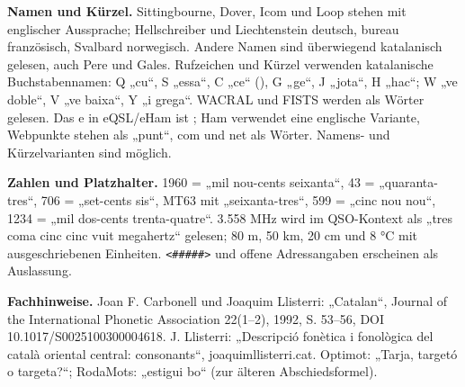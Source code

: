 \documentclass[a4paper,landscape,10pt]{article}
\newcommand{\ipa}[1]{{\ipafont[#1]}}
\begin{document}
\smallskip
\textbf{Namen und Kürzel.} Sittingbourne, Dover, Icom und Loop stehen mit englischer Aussprache;
Hellschreiber und Liechtenstein deutsch, bureau französisch, Svalbard norwegisch.
Andere Namen sind überwiegend katalanisch gelesen, auch Pere und Gales.
Rufzeichen und Kürzel verwenden katalanische Buchstabennamen: Q „cu“, S „essa“, C „ce“ (\ipa{se}),
G „ge“, J „jota“, H „hac“; W „ve doble“, V „ve baixa“, Y „i grega“.
WACRAL und FISTS werden als Wörter gelesen. Das e in eQSL/eHam ist \ipa{i}; Ham verwendet eine englische Variante,
Webpunkte stehen als „punt“, com und net als Wörter. Namens- und Kürzelvarianten sind möglich.

\smallskip
\textbf{Zahlen und Platzhalter.} 1960 = „mil nou-cents seixanta“, 43 = „quaranta-tres“,
706 = „set-cents sis“, MT63 mit „seixanta-tres“, 599 = „cinc nou nou“,
1234 = „mil dos-cents trenta-quatre“. 3.558 MHz wird im QSO-Kontext als „tres coma cinc cinc vuit megahertz“
gelesen; 80 m, 50 km, 20 cm und 8 °C mit ausgeschriebenen Einheiten.
\texttt{<\#\#\#\#\#>} und offene Adressangaben erscheinen als Auslassung.

\smallskip
\textbf{Fachhinweise.} Joan F. Carbonell und Joaquim Llisterri: „Catalan“, Journal of the International
Phonetic Association 22(1--2), 1992, S. 53--56, DOI 10.1017/S0025100300004618.
J. Llisterri: „Descripció fonètica i fonològica del català oriental central: consonants“, joaquimllisterri.cat.
Optimot: „Tarja, targetó o targeta?“; RodaMots: „estigui bo“ (zur älteren Abschiedsformel).
\end{document}

